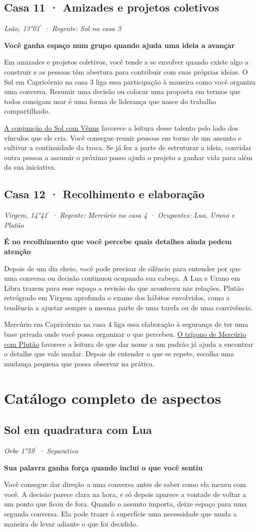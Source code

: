 \documentclass[11pt,a4paper]{article}
\newcommand{\leitura}[3]{\subsection{#1}\textit{#2}\par #3}
\newcommand{\subtituloleitura}[1]{\textbf{#1}\par\nopagebreak[4]}
\newcommand{\aspectoref}[2]{\hyperref[#1]{#2}}
\begin{document}
\leitura{Casa 11 · Amizades e projetos coletivos}{Leão, 13°01\ensuremath{^{\prime}} · Regente: Sol na casa 3}{
\subtituloleitura{Você ganha espaço num grupo quando ajuda uma ideia a avançar}
Em amizades e projetos coletivos, você tende a se envolver quando existe algo a construir e as pessoas têm abertura para contribuir com suas próprias ideias. O Sol em Capricórnio na casa 3 liga essa participação à maneira como você organiza uma conversa. Resumir uma decisão ou colocar uma proposta em termos que todos consigam usar é uma forma de liderança que nasce do trabalho compartilhado.

\aspectoref{aspecto:sol-venus}{A conjunção do Sol com Vênus} favorece a leitura desse talento pelo lado dos vínculos que ele cria. Você consegue reunir pessoas em torno de um assunto e cultivar a continuidade da troca. Se já fez a parte de estruturar a ideia, convidar outra pessoa a assumir o próximo passo ajuda o projeto a ganhar vida para além da sua iniciativa.
}

\leitura{Casa 12 · Recolhimento e elaboração}{Virgem, 14°41\ensuremath{^{\prime}} · Regente: Mercúrio na casa 4 · Ocupantes: Lua, Urano e Plutão}{
\subtituloleitura{É no recolhimento que você percebe quais detalhes ainda pedem atenção}
Depois de um dia cheio, você pode precisar de silêncio para entender por que uma conversa ou decisão continuou ocupando sua cabeça. A Lua e Urano em Libra trazem para esse espaço a revisão do que aconteceu nas relações. Plutão retrógrado em Virgem aprofunda o exame dos hábitos envolvidos, como a tendência a ajustar sempre a mesma parte de uma tarefa ou de uma convivência.

Mercúrio em Capricórnio na casa 4 liga essa elaboração à segurança de ter uma base privada onde você possa organizar o que percebeu. \aspectoref{aspecto:mercurio-plutao}{O trígono de Mercúrio com Plutão} favorece a leitura de que dar nome a um padrão já ajuda a encontrar o detalhe que vale mudar. Depois de entender o que se repete, escolha uma mudança pequena que possa observar na prática.
}

\clearpage

\section{Catálogo completo de aspectos}

\leitura{Sol em quadratura com Lua}{Orbe 1°59\ensuremath{^{\prime}} · Separativo}{
\label{aspecto:sol-lua}\subtituloleitura{Sua palavra ganha força quando inclui o que você sentiu}
Você consegue dar direção a uma conversa antes de saber como ela mexeu com você. A decisão parece clara na hora, e só depois aparece a vontade de voltar a um ponto que ficou de fora. Quando o assunto importa, deixe espaço para uma segunda conversa. Ela pode trazer à superfície uma necessidade que muda a maneira de levar adiante o que foi decidido.
}
\end{document}
